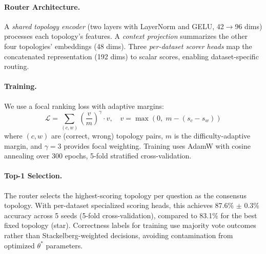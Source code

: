 \paragraph{Router Architecture.} A \emph{shared topology encoder} (two layers with LayerNorm and GELU, 42$\to$96 dims) processes each topology's features. A \emph{context projection} summarizes the other four topologies' embeddings (48 dims). Three \emph{per-dataset scorer heads} map the concatenated representation (192 dims) to scalar scores, enabling dataset-specific routing.

\paragraph{Training.} We use a focal ranking loss with adaptive margins:
\begin{equation}
    \mathcal{L} = \sum_{(c, w)} \left(\frac{v}{m}\right)^\gamma \cdot v, \quad v = \max(0, \; m - (s_c - s_w))
\end{equation}
where $(c, w)$ are (correct, wrong) topology pairs, $m$ is the difficulty-adaptive margin, and $\gamma = 3$ provides focal weighting. Training uses AdamW with cosine annealing over 300 epochs, 5-fold stratified cross-validation.

\paragraph{Top-1 Selection.} The router selects the highest-scoring topology per question as the consensus topology. With per-dataset specialized scoring heads, this achieves 87.6\% $\pm$ 0.3\% accuracy across 5 seeds (5-fold cross-validation), compared to 83.1\% for the best fixed topology (star). Correctness labels for training use majority vote outcomes rather than Stackelberg-weighted decisions, avoiding contamination from optimized $\theta^*$ parameters.

